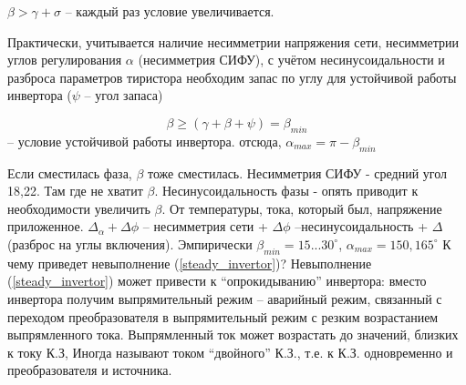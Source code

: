 $\beta>\gamma+\sigma$ -- каждый раз условие увеличивается.

Практически, учитывается наличие несимметрии напряжения сети, несимметрии
углов регулирования $\alpha$ (несимметрия СИФУ), с учётом несинусоидальности
и разброса параметров тиристора необходим запас по углу для устойчивой
работы инвертора ($\psi$ -- угол запаса)

\begin{equation}
\beta \ge (\gamma+\beta+\psi) = \beta_{min}
\label{steady_invertor}
\end{equation} -- условие устойчивой работы инвертора.
отсюда, $\alpha_{max} = \pi - \beta_{min}$


Если сместилась фаза, $\beta$ тоже сместилась. Несимметрия СИФУ - средний угол
18,22. Там где не хватит $\beta$.
Несинусоидальность фазы - опять приводит к необходимости увеличить $\beta$.
От температуры, тока, который был, напряжение приложенное.
${\displaystyle \Delta}_\alpha + {\displaystyle \Delta}\phi$ -- несимметрия
сети + $ {\displaystyle \Delta}\phi$ --несинусоидальность +
 ${\displaystyle \Delta}$ (разброс на углы включения).
 Эмпирически $\beta_{min} = 15...30^\circ$, $\alpha_{max}=150,165^\circ$
К чему приведет невыполнение (\ref{steady_invertor})? Невыполнение (\ref{steady_invertor}) может привести к ``опрокидыванию'' инвертора: вместо инвертора получим
выпрямительный режим -- аварийный режим, связанный с переходом преобразователя
в выпрямительный режим с резким возрастанием выпрямленного тока. Выпрямленный ток
может возрастать до значений, близких к току К.З, Иногда называют током
``двойного'' К.З., т.е. к К.З. одновременно и преобразователя и источника.


